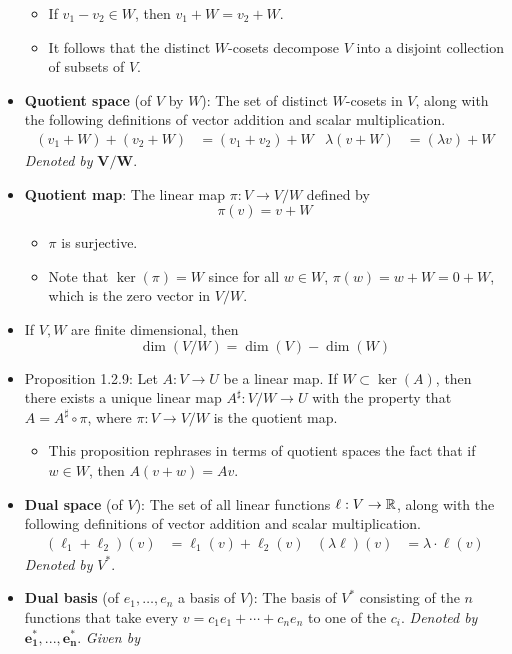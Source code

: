 \documentclass[../notes.tex]{subfiles}
\begin{document}
\begin{itemize}
\begin{itemize}
        \item If $v_1-v_2\in W$, then $v_1+W=v_2+W$.
        \item It follows that the distinct $W$-cosets decompose $V$ into a disjoint collection of subsets of $V$.
    \end{itemize}
    \item \textbf{Quotient space} (of $V$ by $W$): The set of distinct $W$-cosets in $V$, along with the following definitions of vector addition and scalar multiplication.
    \begin{align*}
        (v_1+W)+(v_2+W) &= (v_1+v_2)+W&
        \lambda(v+W) &= (\lambda v)+W
    \end{align*}
    \emph{Denoted by} $\bm{V/W}$.
    \item \textbf{Quotient map}: The linear map $\pi:V\to V/W$ defined by
    \begin{equation*}
        \pi(v) = v+W
    \end{equation*}
    \begin{itemize}
        \item $\pi$ is surjective.
        \item Note that $\ker(\pi)=W$ since for all $w\in W$, $\pi(w)=w+W=0+W$, which is the zero vector in $V/W$.
    \end{itemize}
    \item If $V,W$ are finite dimensional, then
    \begin{equation*}
        \dim(V/W) = \dim(V)-\dim(W)
    \end{equation*}
    \item Proposition 1.2.9: Let $A:V\to U$ be a linear map. If $W\subset\ker(A)$, then there exists a unique linear map $A^\sharp:V/W\to U$ with the property that $A=A^\sharp\circ\pi$, where $\pi:V\to V/W$ is the quotient map.
    \begin{itemize}
        \item This proposition rephrases in terms of quotient spaces the fact that if $w\in W$, then $A(v+w)=Av$.
    \end{itemize}
    \item \textbf{Dual space} (of $V$): The set of all linear functions $\ell:V\to\mathbb{R}$, along with the following definitions of vector addition and scalar multiplication.
    \begin{align*}
        (\ell_1+\ell_2)(v) &= \ell_1(v)+\ell_2(v)&
        (\lambda\ell)(v) &= \lambda\cdot\ell(v)
    \end{align*}
    \emph{Denoted by} $V^*$.
    \item \textbf{Dual basis} (of $e_1,\dots,e_n$ a basis of $V$): The basis of $V^*$ consisting of the $n$ functions that take every $v=c_1e_1+\cdots+c_ne_n$ to one of the $c_i$. \emph{Denoted by} $\bm{e_1^*,...,e_n^*}$. \emph{Given by}

\end{itemize}
\end{document}

